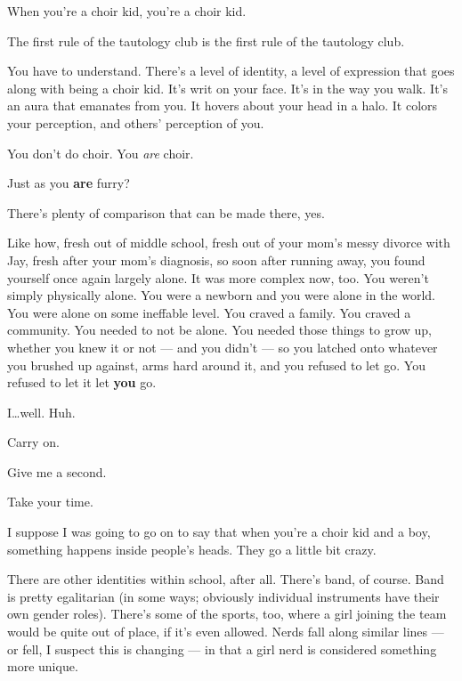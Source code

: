 \begin{leftcolumn}

When you're a choir kid, you're a choir kid.

\begin{ally}
The first rule of the tautology club is the first rule of the tautology club.
\end{ally}
You have to understand. There's a level of identity, a level of expression that goes along with being a choir kid. It's writ on your face. It's in the way you walk. It's an aura that emanates from you. It hovers about your head in a halo. It colors your perception, and others' perception of you.

You don't do choir. You \emph{are} choir.

\begin{ally}
Just as you \textbf{are} furry?
\end{ally}
There's plenty of comparison that can be made there, yes.

\begin{ally}
Like how, fresh out of middle school, fresh out of your mom's messy divorce with Jay, fresh after your mom's diagnosis, so soon after running away, you found yourself once again largely alone. It was more complex now, too. You weren't simply physically alone. You were a newborn and you were alone in the world. You were alone on some ineffable level. You craved a family. You craved a community. You needed to not be alone. You needed those things to grow up, whether you knew it or not --- and you didn't --- so you latched onto whatever you brushed up against, arms hard around it, and you refused to let go. You refused to let it let \textbf{you} go.
\end{ally}
I\ldots{}well. Huh.

\begin{ally}
Carry on.
\end{ally}
Give me a second.

\begin{ally}
Take your time.
\end{ally}
I suppose I was going to go on to say that when you're a choir kid and a boy, something happens inside people's heads. They go a little bit crazy.

There are other identities within school, after all. There's band, of course. Band is pretty egalitarian (in some ways; obviously individual instruments have their own gender roles). There's some of the sports, too, where a girl joining the team would be quite out of place, if it's even allowed. Nerds fall along similar lines --- or fell, I suspect this is changing --- in that a girl nerd is considered something more unique.


\end{leftcolumn}
